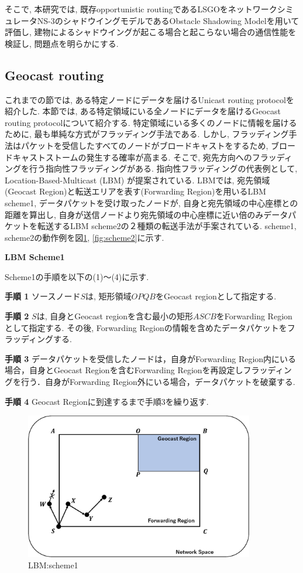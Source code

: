 \documentclass[10pt]{jreport}
\begin{document}
そこで, 本研究では, 既存opportunistic routingであるLSGOをネットワークシミュレータNS-3\cite{19}のシャドウイングモデルであるObstacle Shadowing Model\cite{20}を用いて評価し, 建物によるシャドウイングが起こる場合と起こらない場合の通信性能を検証し, 問題点を明らかにする.


\subsection{Geocast routing}
これまでの節では, ある特定ノードにデータを届けるUnicast routing protocolを紹介した.
本節では, ある特定領域にいる全ノードにデータを届けるGeocast routing protocol\cite{Geocast}について紹介する.
特定領域にいる多くのノードに情報を届けるために, 最も単純な方式がフラッディング手法である.
しかし, フラッディング手法はパケットを受信したすべてのノードがブロードキャストをするため, ブロードキャストストームの発生する確率が高まる.
そこで, 宛先方向へのフラッディングを行う指向性フラッディングがある. 指向性フラッディングの代表例として, Location-Based-Multicast (LBM) \cite{LBM}が提案されている.
LBMでは, 宛先領域(Geocast Region)と転送エリアを表す(Forwarding Region)を用いるLBM scheme1, データパケットを受け取ったノードが, 自身と宛先領域の中心座標との距離を算出し, 自身が送信ノードより宛先領域の中心座標に近い倍のみデータパケットを転送するLBM scheme2の２種類の転送手法が手案されている.
scheme1, scheme2の動作例を図\ref{fig:scheme1}, \ref{fig:scheme2}に示す.

\par
\vspace{5mm}
\noindent
\textbf{LBM Scheme1}
\vspace{5mm}

Scheme1の手順を以下の(1)～(4)に示す.


\textbf{手順 1} ソースノード$S$は, 矩形領域$OPQB$をGeocast regionとして指定する.

\textbf{手順 2} $S$は, 自身とGeocast regionを含む最小の矩形$ASCB$をForwarding Regionとして指定する. その後, Forwarding Regionの情報を含めたデータパケットをフラッディングする.

\textbf{手順 3} データパケットを受信したノードは，自身がForwarding Region内にいる場合，自身とGeocast Regionを含むForwarding Regionを再設定しフラッディングを行う．自身がForwarding Region外にいる場合，データパケットを破棄する.

\textbf{手順 4} Geocast Regionに到達するまで手順3を繰り返す. 


\begin{figure}[!ht]
	\centering
	\includegraphics[width=100mm]{figures/Scheme1.eps}
	\caption{LBM:scheme1}
	\label{fig:scheme1}
\end{figure}
\end{document}
